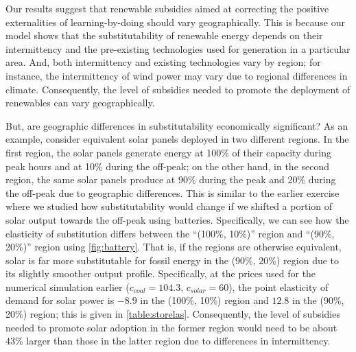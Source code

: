 \documentclass[11pt,a4paper,leqno]{extarticle}
\begin{document}
	Our results suggest that renewable subsidies aimed at correcting the positive externalities of learning-by-doing should vary geographically. This is because our model shows that the substitutability of renewable energy depends on their intermittency and the pre-existing technologies used for generation in a particular area. And, both intermittency and existing technologies vary by region; for instance, the intermittency of wind power may vary due to regional differences in climate. Consequently, the level of subsidies needed to promote the deployment of renewables can vary geographically. 
	
	But, are geographic differences in substitutability economically significant? As an example, consider equivalent solar panels deployed in two different regions. In the first region, the solar panels generate energy at 100\% of their capacity during peak hours and at 10\%  during the off-peak; on the other hand, in the second region, the same solar panels produce at 90\% during the peak and 20\% during the off-peak due to geographic differences. This is similar to the earlier exercise where we studied how substitutability would change if we shifted a portion of solar output towards the off-peak using batteries. Specifically, we can see how the elasticity of substitution differs between  the ``(100\%, 10\%)'' region and ``(90\%, 20\%)'' region using  \autoref{fig:battery}. That is, if the regions are otherwise equivalent, solar is far more substitutable for fossil energy in the (90\%, 20\%) region due to its slightly smoother output profile. Specifically, at the prices used for the numerical simulation earlier ($c_{coal} = 104.3, \, c_{solar} = 60$), the point elasticity of demand for solar power is $-8.9$ in the (100\%, 10\%) region  and  $12.8$ in the (90\%, 20\%) region; this is given in \autoref{table:storelas}.  Consequently, the level of subsidies needed to promote solar adoption in the former region would need to be about 43\% larger than those in the latter region due to differences in intermittency. 
	
\end{document}
